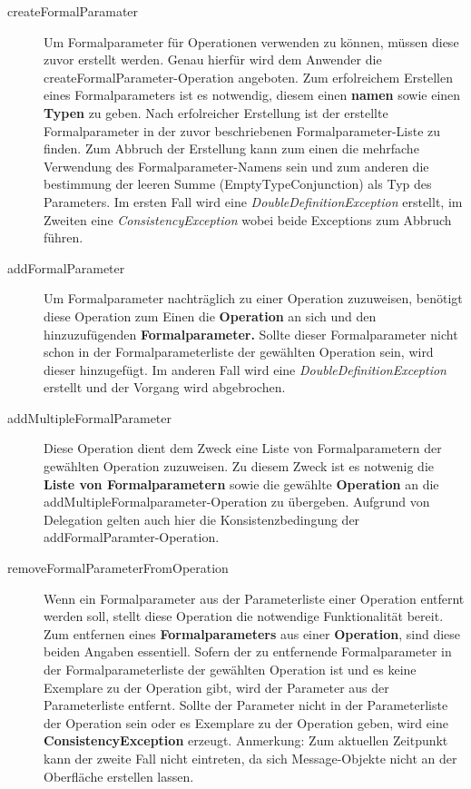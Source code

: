 \begin{description}
\item[createFormalParamater]
Um Formalparameter für Operationen verwenden zu können, müssen diese zuvor erstellt werden. Genau hierfür wird dem Anwender die createFormalParameter-Operation angeboten.
Zum erfolreichem Erstellen eines Formalparameters ist es notwendig, diesem einen \textbf{namen} sowie einen \textbf{Typen} zu geben. Nach erfolreicher Erstellung ist der erstellte Formalparameter in der zuvor beschriebenen Formalparameter-Liste zu finden. Zum Abbruch der Erstellung kann zum einen die mehrfache Verwendung des Formalparameter-Namens sein und zum anderen die bestimmung der leeren Summe (EmptyTypeConjunction) als Typ des Parameters. Im ersten Fall wird eine \emph{DoubleDefinitionException} erstellt, im Zweiten eine \emph{ConsistencyException} wobei beide Exceptions zum Abbruch führen.
\item[addFormalParameter]
Um Formalparameter nachträglich zu einer Operation zuzuweisen, benötigt diese Operation zum Einen die \textbf{Operation} an sich und den hinzuzufügenden \textbf{Formalparameter.} Sollte dieser Formalparameter nicht schon in der Formalparameterliste der gewählten Operation sein, wird dieser hinzugefügt. Im anderen Fall wird eine \emph{DoubleDefinitionException} erstellt und der Vorgang wird abgebrochen.
\item[addMultipleFormalParameter]
Diese Operation dient dem Zweck eine Liste von Formalparametern der gewählten Operation zuzuweisen.
Zu diesem Zweck ist es notwenig die \textbf{Liste von Formalparametern} sowie 
die gewählte \textbf{Operation} an die addMultipleFormalparameter-Operation zu übergeben. 
Aufgrund von Delegation gelten auch hier die Konsistenzbedingung der addFormalParamter-Operation. 
\item[removeFormalParameterFromOperation]
Wenn ein Formalparameter aus der Parameterliste einer Operation entfernt werden soll, stellt diese Operation die notwendige Funktionalität bereit. Zum entfernen eines \textbf{Formalparameters} aus einer \textbf{Operation}, sind diese beiden Angaben essentiell. Sofern der zu entfernende Formalparameter in der Formalparameterliste der gewählten Operation ist und es keine Exemplare zu der Operation gibt, wird der Parameter aus der Parameterliste entfernt.
Sollte der Parameter nicht in der Parameterliste der Operation sein oder es Exemplare zu der Operation geben, wird eine \textbf{ConsistencyException} erzeugt. \newline
Anmerkung: Zum aktuellen Zeitpunkt kann der zweite Fall nicht eintreten, da sich Message-Objekte nicht an der Oberfläche erstellen lassen.

\end{description}
